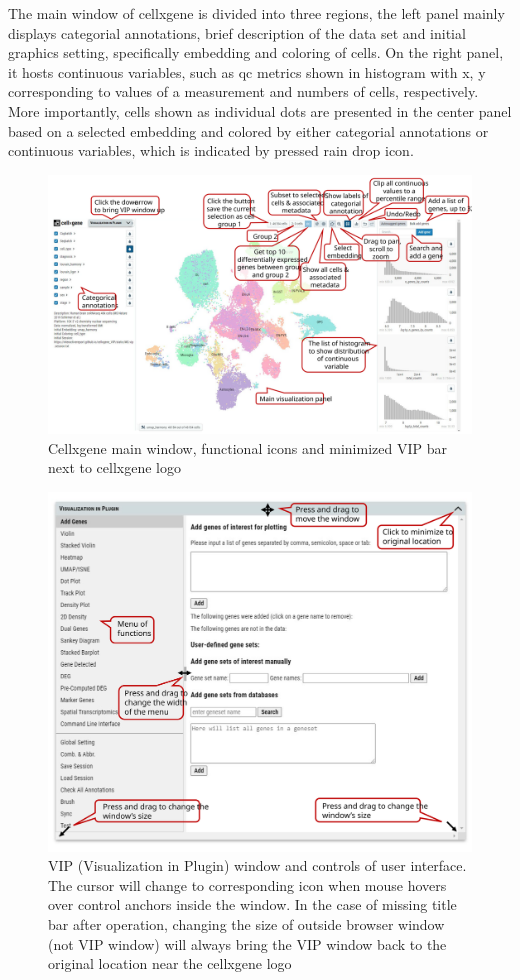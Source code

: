 \documentclass[
]{article}
\begin{document}
The main window of cellxgene is divided into three regions, the left panel mainly displays categorial
annotations, brief description of the data set and initial graphics setting, specifically embedding and
coloring of cells. On the right panel, it hosts continuous variables, such as qc metrics shown in histogram
with x, y corresponding to values of a measurement and numbers of cells, respectively. More
importantly, cells shown as individual dots are presented in the center panel based on a selected
embedding and colored by either categorial annotations or continuous variables, which is indicated by
pressed rain drop icon.

\begin{figure}
\centering
\includegraphics{figures/F1A_label.svg}
\caption{Cellxgene main window, functional icons and minimized VIP bar next to cellxgene logo}
\end{figure}

\begin{figure}
\centering
\includegraphics{figures/F1B_label.svg}
\caption{VIP (Visualization in Plugin) window and controls of user interface. The cursor will change to corresponding icon when mouse hovers over control anchors inside the window. In the case of missing title bar after operation, changing the size of outside browser window (not VIP window) will always bring the VIP window back to the original location near the cellxgene logo}
\end{figure}
\end{document}
